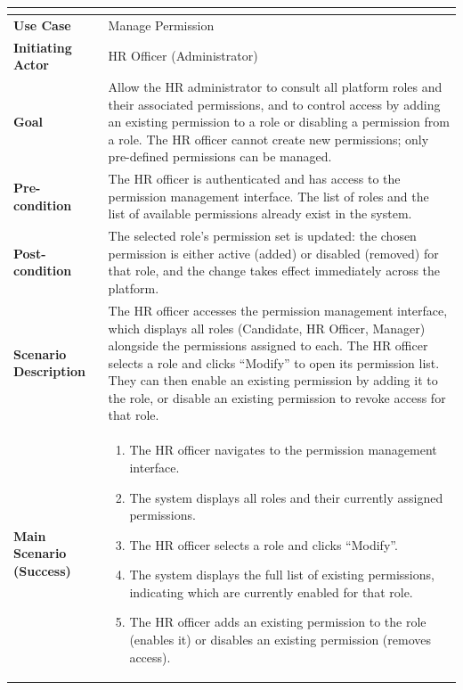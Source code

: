 \setlength{\tabcolsep}{4pt}
\renewcommand{\arraystretch}{1.3}
\begin{table}[H]
\centering
\small
\begin{tabularx}{\textwidth}{|>{\bfseries\arraybackslash}p{4cm}|X|}
\hline
\rowcolor{headerblue}
\multicolumn{2}{|c|}{\textbf{Use Case: Manage Permission}} \\
\hline
Use Case            & Manage Permission \\
\hline
Initiating Actor    & HR Officer (Administrator) \\
\hline
Goal                & Allow the HR administrator to consult all platform roles and their associated permissions, and to control access by adding an existing permission to a role or disabling a permission from a role. The HR officer cannot create new permissions; only pre-defined permissions can be managed. \\
\hline
Pre-condition       & The HR officer is authenticated and has access to the permission management interface. The list of roles and the list of available permissions already exist in the system. \\
\hline
Post-condition      & The selected role's permission set is updated: the chosen permission is either active (added) or disabled (removed) for that role, and the change takes effect immediately across the platform. \\
\hline
Scenario Description &
The HR officer accesses the permission management interface, which displays all roles (Candidate, HR Officer, Manager) alongside the permissions assigned to each. The HR officer selects a role and clicks ``Modify'' to open its permission list. They can then enable an existing permission by adding it to the role, or disable an existing permission to revoke access for that role. \\
\hline
Main Scenario (Success) &
\begin{enumerate}[leftmargin=*, label=\arabic*., topsep=0pt, itemsep=0pt]
    \item The HR officer navigates to the permission management interface.
    \item The system displays all roles and their currently assigned permissions.
    \item The HR officer selects a role and clicks ``Modify''.
    \item The system displays the full list of existing permissions, indicating which are currently enabled for that role.
    \item The HR officer adds an existing permission to the role (enables it) or disables an existing permission (removes access).

\end{enumerate}
\end{tabularx}
\end{table}

